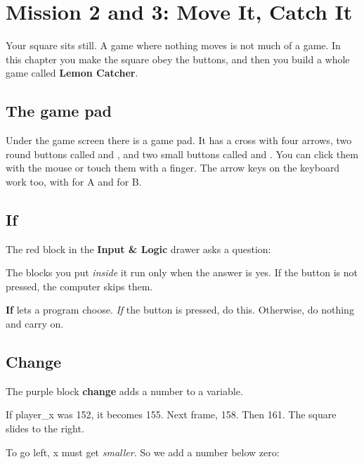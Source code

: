 \chapter{Mission 2 and 3: Move It, Catch It}
\label{ch:kids2}

Your square sits still. A game where nothing moves is not much of a game. In
this chapter you make the square obey the buttons, and then you build a whole
game called \textbf{Lemon Catcher}.

\section{The game pad}

Under the game screen there is a game pad. It has a cross with four arrows, two
round buttons called  and , and two small buttons called
 and . You can click them with the mouse or touch them
with a finger. The arrow keys on the keyboard work too, with  for A and
 for B.

\section{If}

The red block in the \textbf{Input \& Logic} drawer asks a question:


The blocks you put \emph{inside} it run only when the answer is yes. If the
button is not pressed, the computer skips them.

\begin{prgconcept}
\textbf{If} lets a program choose. \emph{If} the button is pressed, do this.
Otherwise, do nothing and carry on.
\end{prgconcept}

\section{Change}

The purple block \textbf{change} adds a number to a variable.


If player\_x was 152, it becomes 155. Next frame, 158. Then 161. The square
slides to the right.

To go left, x must get \emph{smaller}. So we add a number below zero:


